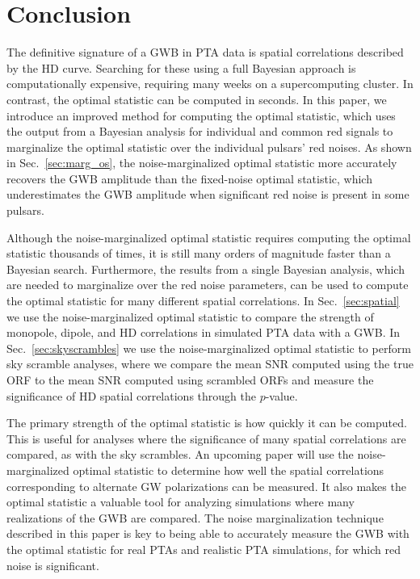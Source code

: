 \documentclass[twocolumn,aps,prd,superscriptaddress]{revtex4-1}
\begin{document}
\section{Conclusion}
\label{sec:conclusion}

The definitive signature of a GWB in PTA data is spatial correlations 
described by the HD curve. 
Searching for these using a full Bayesian approach is computationally expensive, 
requiring many weeks on a supercomputing cluster. 
In contrast, the optimal statistic can be computed in seconds. 
In this paper, we introduce an improved method 
for computing the optimal statistic, 
which uses the output from a Bayesian analysis 
for individual and common red signals 
to marginalize the optimal statistic over the individual pulsars' red noises. 
As shown in Sec.~\ref{sec:marg_os}, 
the noise-marginalized optimal statistic more accurately recovers the GWB amplitude 
than the fixed-noise optimal statistic, which underestimates the GWB amplitude 
when significant red noise is present in some pulsars.

Although the noise-marginalized optimal statistic 
requires computing the optimal statistic thousands of times, 
it is still many orders of magnitude faster than a Bayesian search. 
Furthermore, the results from a single Bayesian analysis, 
which are needed to marginalize over the red noise parameters, 
can be used to compute the optimal statistic for many different spatial correlations. 
In Sec.~\ref{sec:spatial} we use the noise-marginalized optimal statistic 
to compare the strength of monopole, dipole, and HD correlations 
in simulated PTA data with a GWB. 
In Sec.~\ref{sec:skyscrambles} we use the noise-marginalized optimal statistic 
to perform sky scramble analyses, where we compare the mean SNR 
computed using the true ORF to the mean SNR computed using scrambled ORFs 
and measure the significance of HD spatial correlations through the $p$-value.

The primary strength of the optimal statistic is how quickly it can be computed. 
This is useful for analyses where the significance of many spatial correlations are compared, 
as with the sky scrambles. 
An upcoming paper will use the noise-marginalized optimal statistic 
to determine how well the spatial correlations corresponding to alternate GW polarizations 
can be measured. 
It also makes the optimal statistic a valuable tool for analyzing simulations 
where many realizations of the GWB are compared. 
The noise marginalization technique described in this paper is key 
to being able to accurately measure the GWB with the optimal statistic 
for real PTAs and realistic PTA simulations, 
for which red noise is significant.
\end{document}
